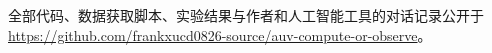 \documentclass[zihao=5, a4paper, oneside]{ctexart}
\begin{document}
\vspace{4pt}
全部代码、数据获取脚本、实验结果与作者和人工智能工具的对话记录公开于
\url{https://github.com/frankxucd0826-source/auv-compute-or-observe}。
\vspace{6pt}











\appendix
{\sloppy\par}
\end{document}
